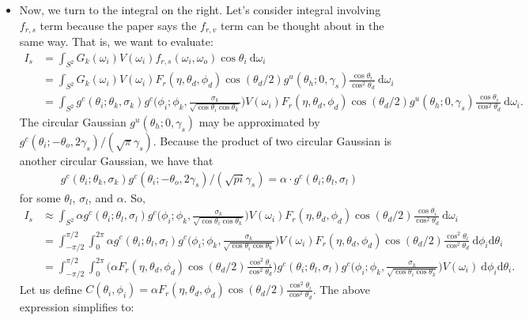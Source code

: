 \documentclass[10pt]{article}
\newcommand{\dee}{\mathrm{d}}
\begin{document}
\begin{itemize}
    \item Now, we turn to the integral on the right.  Let's consider integral involving $f_{r,s}$ term because the paper says the $f_{r,v}$ term can be thought about in the same way.  That is, we want to evaluate:
    \begin{align*}
      I_s 
      &= \int_{S^2} G_k(\omega_i) V(\omega_i) f_{r,s}(\omega_i,\omega_o) \cos\theta_i\ \dee\omega_i \\
      &= \int_{S^2} G_k(\omega_i) V(\omega_i) F_r(\eta,\theta_d,\phi_d) \cos(\theta_d/2) g^u(\theta_h;0,\gamma_s) \frac{\cos\theta_i}{\cos^2\theta_d}\ \dee\omega_i \\
      &= \int_{S^2} g^c(\theta_i;\theta_k,\sigma_k) g^c\bigg(\phi_i; \phi_k, \frac{\sigma_k}{\sqrt{\cos\theta_i\cos\theta_k}}\bigg) V(\omega_i) F_r(\eta,\theta_d,\phi_d) \cos(\theta_d/2) g^u(\theta_h;0,\gamma_s) \frac{\cos\theta_i}{\cos^2\theta_d}\ \dee\omega_i.
    \end{align*}
    The circular Gaussian $g^u(\theta_h;0,\gamma_s)$ may be approximated by $g^c(\theta_i;-\theta_o,2\gamma_s)/ (\sqrt{\pi} \gamma_s)$.  Because the product of two circular Gaussian is another circular Gaussian, we have that
    \begin{align*}
      g^c(\theta_i;\theta_k,\sigma_k) g^c(\theta_i;-\theta_o,2\gamma_s) / (\sqrt{pi}\gamma_s)
      = \alpha \cdot g^c(\theta_i;\theta_l,\sigma_l)      
    \end{align*}
    for some $\theta_l$, $\sigma_l$, and $\alpha$.  So,
    \begin{align*}
      I_s 
      &\approx \int_{S^2} \alpha g^c(\theta_i;\theta_l,\sigma_l) g^c\bigg(\phi_i; \phi_k, \frac{\sigma_k}{\sqrt{\cos\theta_i\cos\theta_k}}\bigg) V(\omega_i) F_r(\eta,\theta_d,\phi_d) \cos(\theta_d/2) \frac{\cos\theta_i}{\cos^2\theta_d}\ \dee\omega_i \\
      &= \int_{-\pi/2}^{\pi/2} \int_{0}^{2\pi} \alpha g^c(\theta_i;\theta_l,\sigma_l) g^c\bigg(\phi_i; \phi_k, \frac{\sigma_k}{\sqrt{\cos\theta_i\cos\theta_k}}\bigg) V(\omega_i) F_r(\eta,\theta_d,\phi_d) \cos(\theta_d/2) \frac{\cos^2\theta_i}{\cos^2\theta_d}\ \dee\phi_i \dee\theta_i \\
      &= \int_{-\pi/2}^{\pi/2} \int_{0}^{2\pi} \bigg( \alpha F_r(\eta,\theta_d,\phi_d) \cos(\theta_d/2) \frac{\cos^2\theta_i}{\cos^2\theta_d} \bigg) g^c(\theta_i;\theta_l,\sigma_l) g^c\bigg(\phi_i; \phi_k, \frac{\sigma_k}{\sqrt{\cos\theta_i\cos\theta_k}}\bigg) V(\omega_i)\ \dee\phi_i \dee\theta_i.
    \end{align*}
    Let us define $C(\theta_i, \phi_i) = \alpha F_r(\eta,\theta_d,\phi_d) \cos(\theta_d/2) \frac{\cos^2\theta_i}{\cos^2\theta_d}$.  The above expression simplifies to:

\end{itemize}
\end{document}
